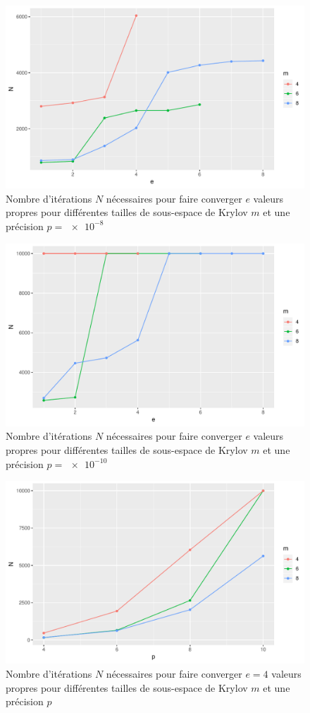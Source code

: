 \documentclass[11pt,a4paper]{article}
\begin{document}
\begin{figure}
	\centering
	\includegraphics[width=0.8\linewidth, keepaspectratio]{plots/Nvse-m_p8.pdf}
	\caption{Nombre d'itérations $N$ nécessaires pour faire converger $e$ valeurs propres pour différentes tailles de sous-espace de Krylov $m$ et une précision $p=\SI{e-8}{}$ \label{fig:Nvse-m_p8}}
\end{figure}

\begin{figure}
	\centering
	\includegraphics[width=0.8\linewidth, keepaspectratio]{plots/Nvse-m_p10.pdf}
	\caption{Nombre d'itérations $N$ nécessaires pour faire converger $e$ valeurs propres pour différentes tailles de sous-espace de Krylov $m$ et une précision $p=\SI{e-10}{}$ \label{fig:Nvse-m_p10}}
\end{figure}

\begin{figure}
	\centering
	\includegraphics[width=0.8\linewidth, keepaspectratio]{plots/Nvsp-m_e4.pdf}
	\caption{Nombre d'itérations $N$ nécessaires pour faire converger $e = 4$ valeurs propres pour différentes tailles de sous-espace de Krylov $m$ et une précision $p$ \label{fig:Nvsp-m_e4}}
\end{figure}
\end{document}
